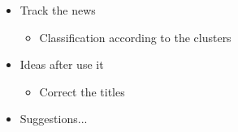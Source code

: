 \documentclass[12pt]{beamer}
\begin{document}
\begin{frame}



\begin{itemize}
\item Track the news
\begin{itemize}
\item Classification according to the clusters
\end{itemize}
\item Ideas after use it
\begin{itemize}
\item Correct the titles
\end{itemize}
\item Suggestions...
\end{itemize}
\end{frame}
\end{document}
